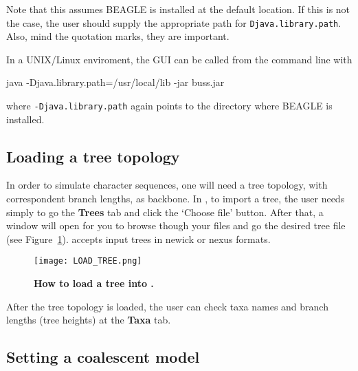 Note that this assumes BEAGLE is installed at the default location. If this is not the case, the user should supply the appropriate path for \texttt{Djava.library.path}. Also, mind the quotation marks, they are important.

In a UNIX/Linux enviroment, the {\bussname} GUI can be called from the command line with

\begin{code}
java -Djava.library.path=/usr/local/lib -jar buss.jar 
\end{code}

\noindent
where \texttt{-Djava.library.path} again points to the directory where BEAGLE is installed.

\def\loading{Loading a tree topology}
\subsection{\loading}

In order to simulate character sequences, one will need a tree topology, with correspondent branch lengths, as  backbone. In {\bussname}, to import a tree, the user needs simply to go the \textbf{Trees} tab and click the `Choose file' button. After that, a window will open for you to browse though your files and go the desired tree file (see Figure~\ref{fig:loadingtopology}). {\bussname} accepts input trees in newick or nexus formats.

\begin{figure}[h!]
\centering
\texttt{[image: LOAD\_TREE.png]} 
\caption{
{ \footnotesize 
{\bf How to load a tree into {\bussname}.}
} %
}
\label{fig:loadingtopology}
\end{figure}

After the tree topology is loaded, the user can check taxa names and branch lengths (tree heights) at the \textbf{Taxa} tab. 

\subsection{Setting a coalescent model}

